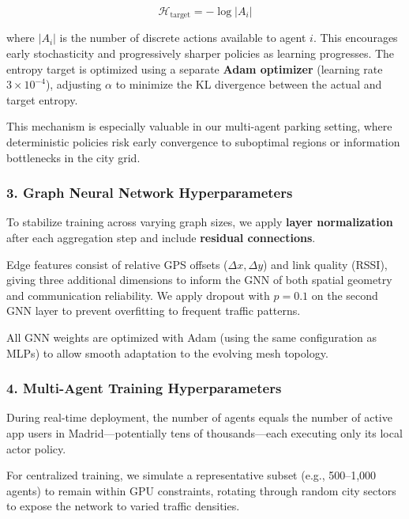 \[
\mathcal{H}_{\text{target}} = -\log |A_i|
\]

where \( |A_i| \) is the number of discrete actions available to agent \( i \). This encourages early stochasticity and progressively sharper policies as learning progresses. The entropy target is optimized using a separate \textbf{Adam optimizer} (learning rate \( 3 \times 10^{-4} \)), adjusting \( \alpha \) to minimize the KL divergence between the actual and target entropy.

This mechanism is especially valuable in our multi-agent parking setting, where deterministic policies risk early convergence to suboptimal regions or information bottlenecks in the city grid.

\vspace{1em}

\subsubsection*{3. Graph Neural Network Hyperparameters}

To stabilize training across varying graph sizes, we apply \textbf{layer normalization} after each aggregation step and include \textbf{residual connections}. 

Edge features consist of relative GPS offsets (\( \Delta x, \Delta y \)) and link quality (RSSI), giving three additional dimensions to inform the GNN of both spatial geometry and communication reliability. We apply dropout with \( p = 0.1 \) on the second GNN layer to prevent overfitting to frequent traffic patterns.

All GNN weights are optimized with Adam (using the same configuration as MLPs) to allow smooth adaptation to the evolving mesh topology.

\vspace{1em}

\subsubsection*{4. Multi-Agent Training Hyperparameters}

During real-time deployment, the number of agents equals the number of active app users in Madrid—potentially tens of thousands—each executing only its local actor policy. 

For centralized training, we simulate a representative subset (e.g., 500–1,000 agents) to remain within GPU constraints, rotating through random city sectors to expose the network to varied traffic densities.

